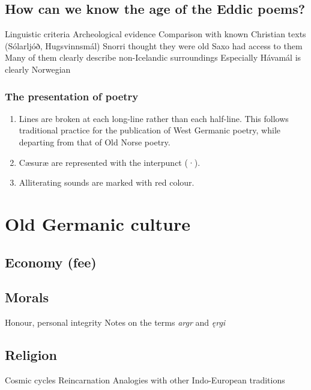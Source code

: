   \subsection{How can we know the age of the Eddic poems?}
    Linguistic criteria
    Archeological evidence
    Comparison with known Christian texts (Sólarljóð, Hugsvinnsmál)
    Snorri thought they were old
    Saxo had access to them
    Many of them clearly describe non-Icelandic surroundings
      Especially Hávamál is clearly Norwegian

  \subsubsection{The presentation of poetry}
    \begin{enumerate}
      \item Lines are broken at each long-line rather than each half-line.  This follows traditional practice for the publication of West Germanic poetry, while departing from that of Old Norse poetry.
      \item Cæsuræ are represented with the interpunct (·).
      \item Alliterating sounds are marked with red colour.
    \end{enumerate}

\section{Old Germanic culture}
  \subsection{Economy (fee)}
  \subsection{Morals}
    Honour, personal integrity
    Notes on the terms \emph{argr} and \emph{ęrgi}
  \subsection{Religion}
    Cosmic cycles
    Reincarnation
    Analogies with other Indo-European traditions


